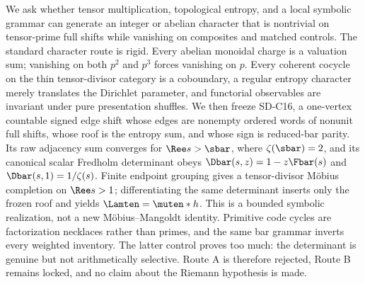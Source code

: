 We ask whether tensor multiplication, topological entropy, and a local
symbolic grammar can generate an integer or abelian character that is
nontrivial on tensor-prime full shifts while vanishing on composites and
matched controls.  The standard character route is rigid.  Every abelian
monoidal charge is a valuation sum; vanishing on both $p^2$ and $p^3$ forces
vanishing on $p$.  Every coherent cocycle on the thin tensor-divisor category
is a coboundary, a regular entropy character merely translates the Dirichlet
parameter, and functorial observables are invariant under pure presentation
shuffles.  We then freeze SD-C16, a one-vertex countable signed edge shift
whose edges are nonempty ordered words of nonunit full shifts, whose roof is
the entropy sum, and whose sign is reduced-bar parity.  Its raw adjacency sum
converges for $\Ree s>\sbar$, where $\zeta(\sbar)=2$, and its canonical scalar
Fredholm determinant obeys
$\Dbar(s,z)=1-z\Fbar(s)$ and $\Dbar(s,1)=1/\zeta(s)$.
Finite endpoint grouping gives a tensor-divisor M\"obius completion on
$\Ree s>1$; differentiating the same determinant inserts only the frozen
roof and yields $\Lamten=\muten*h$.  This is a bounded symbolic realization,
not a new M\"obius--Mangoldt identity.  Primitive code cycles are
factorization necklaces rather than primes, and the same bar grammar inverts
every weighted inventory.  The latter control proves too much: the
determinant is genuine but not arithmetically selective.  Route A is therefore
rejected, Route B remains locked, and no claim about the Riemann hypothesis is
made.
